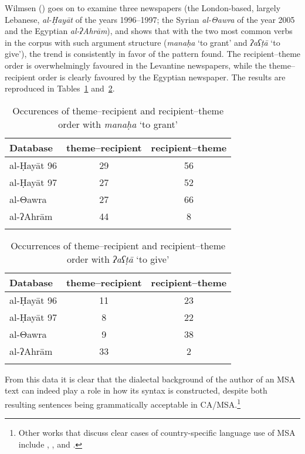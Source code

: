 \documentclass[output=paper]{langsci/langscibook}
\begin{document}
Wilmsen (\citeyear[114--115]{Wilmsen2010}) goes on to examine three newspapers (the London-based, largely Lebanese, \textit{al-Ḥayāt} of the years 1996--1997; the Syrian \textit{al-Θawra} of the year 2005 and the Egyptian \textit{al-ʔAhrām}), and shows that with the two most common verbs in the corpus with such argument structure (\textit{manaḥa} ‘to grant’ and \textit{ʔaʕṭā} ‘to give’), the trend is consistently in favor of the pattern found. The recipient–theme order is overwhelmingly favoured in the Levantine newspapers, while the theme–recipient order is clearly favoured by the Egyptian newspaper. The results are reproduced in Tables~\ref{tab:vanputten:1} and~\ref{tab:vanputten:2}.


\begin{table}
\begin{tabular}{lcc}
\lsptoprule
{Database} & {theme–recipient} & {recipient–theme}\\\midrule
al-Ḥayāt 96 & 29 & 56\\
al-Ḥayāt 97 & 27 & 52\\
al-Θawra & 27 & 66\\
al-ʔAhrām & 44 & \hphantom{1}8\\
\lspbottomrule
\end{tabular}
\caption{\label{bkm:Ref533762442}\label{tab:vanputten:1}Occurences of theme–recipient and recipient–theme order with \textit{manaḥa} ‘to grant’}
\end{table}

\begin{table}
\begin{tabular}{lcc}
\lsptoprule
{Database} & {theme–recipient} & {recipient–theme}\\\midrule
al-Ḥayāt 96 & 11 & 23\\
al-Ḥayāt 97 & \hphantom{1}8 & 22\\
al-Θawra    &  \hphantom{1}9 & 38\\
al-ʔAhrām   & 33 &  \hphantom{1}2\\
\lspbottomrule
\end{tabular}
\caption{\label{bkm:Ref533762457}\label{tab:vanputten:2}Occurrences of theme–recipient and recipient–theme order with \textit{ʔaʕṭā} ‘to give’}
\end{table}

From this data it is clear that the dialectal background of the author of an MSA text can indeed play a role in how its syntax is constructed, despite both resulting sentences being grammatically acceptable in CA/MSA.\footnote{Other works that discuss clear cases of country-specific language use of MSA include \citet{Ibrahim2009}, \citet{Parkinson2003},  \citet{Parkinson2007} and \citet{ParkinsonIbrahim1999}.}
\end{document}
